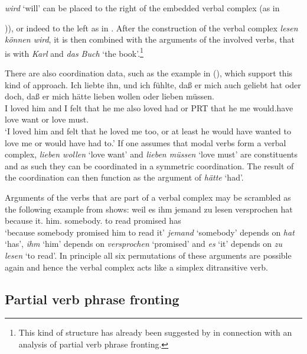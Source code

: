 \emph{wird} `will' can be placed to the right of the embedded verbal complex (as in {)), or indeed to the left as
in . After the construction of the verbal complex \emph{lesen können wird}, it is then combined with the 
arguments of the involved verbs, that is with \emph{Karl} and \emph{das Buch} `the book'.\footnote{
		This kind of structure has already been suggested 
		by \citet*{Johnson86a} in connection with an analysis of partial verb phrase fronting.
}

There are also coordination data, such as the example in (), which support this kind of approach.
\ea
\gll Ich liebte ihn, und ich fühlte, daß er mich auch geliebt hat oder doch, daß er mich hätte lieben wollen oder lieben müssen.\footnotemark\\
     I   loved  him and I felt that he me also loved had or PRT that he me   would.have love want or love must.\\
\glt `I loved him and felt that he loved me too, or at least he would have wanted to love me or would have had to.'
\z
If one assumes that modal verbs form a verbal complex, \emph{lieben wollen} `love want' and
\emph{lieben müssen} `love must' are constituents and as such they can be coordinated in a symmetric
coordination. The result of the coordination can then function as the argument of \emph{hätte}
`had'.

Arguments of the verbs that are part of a verbal complex may be scrambled as the following example
from \citet{Haider90b} shows:
\ea\label{ex-weil-es-ihm-jemand-zu-lesen-versprochen-hat}
\gll weil es ihm jemand zu lesen versprochen hat\\
     because it.\acc{} him.\dat{} somebody.\nom{} to read promised has\\
\glt `because somebody promised him to read it'
\z
\emph{jemand} `somebody' depends on \emph{hat} `has', \emph{ihm} `him' depends on \emph{versprochen}
`promised' and \emph{es} `it' depends on \emph{zu lesen} `to read'. In principle all six
permutations of these arguments are possible again and hence the verbal complex acts like a simplex
ditransitive verb.

\subsection{Partial verb phrase fronting}
\label{sec-pvp-phen}

}
